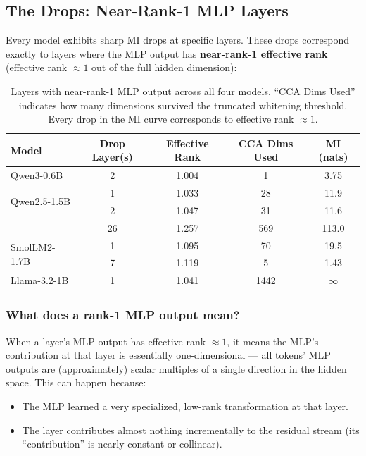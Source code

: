 \documentclass[11pt]{article}
\begin{document}
\subsection{The Drops: Near-Rank-1 MLP Layers}

Every model exhibits sharp MI drops at specific layers. These drops correspond exactly to layers where the MLP output has \textbf{near-rank-1 effective rank} (effective rank $\approx 1$ out of the full hidden dimension):

\begin{table}[h]
\centering
\begin{tabular}{lcccc}
\toprule
\textbf{Model} & \textbf{Drop Layer(s)} & \textbf{Effective Rank} & \textbf{CCA Dims Used} & \textbf{MI (nats)} \\
\midrule
Qwen3-0.6B & 2 & 1.004 & 1 & 3.75 \\
\midrule
\multirow{2}{*}{Qwen2.5-1.5B} & 1 & 1.033 & 28 & 11.9 \\
 & 2 & 1.047 & 31 & 11.6 \\
 & 26 & 1.257 & 569 & 113.0 \\
\midrule
\multirow{2}{*}{SmolLM2-1.7B} & 1 & 1.095 & 70 & 19.5 \\
 & 7 & 1.119 & 5 & 1.43 \\
\midrule
Llama-3.2-1B & 1 & 1.041 & 1442 & $\infty$ \\
\bottomrule
\end{tabular}
\caption{Layers with near-rank-1 MLP output across all four models. ``CCA Dims Used'' indicates how many dimensions survived the truncated whitening threshold. Every drop in the MI curve corresponds to effective rank $\approx 1$.}
\label{tab:drops}
\end{table}

\subsubsection{What does a rank-1 MLP output mean?}

When a layer's MLP output has effective rank $\approx 1$, it means the MLP's contribution at that layer is essentially one-dimensional --- all tokens' MLP outputs are (approximately) scalar multiples of a single direction in the hidden space. This can happen because:
\begin{itemize}
    \item The MLP learned a very specialized, low-rank transformation at that layer.
    \item The layer contributes almost nothing incrementally to the residual stream (its ``contribution'' is nearly constant or collinear).
\end{itemize}
\end{document}
